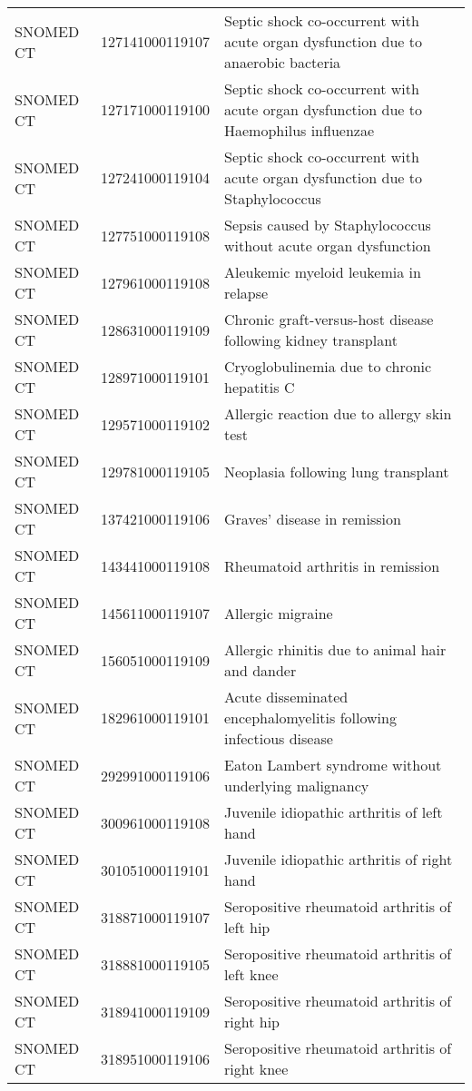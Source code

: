 \begin{longtable}{p{}p{}p{}}
  SNOMED CT & 127141000119107 & Septic shock co-occurrent with acute organ dysfunction due to anaerobic bacteria \\ 
  SNOMED CT & 127171000119100 & Septic shock co-occurrent with acute organ dysfunction due to Haemophilus influenzae \\ 
  SNOMED CT & 127241000119104 & Septic shock co-occurrent with acute organ dysfunction due to Staphylococcus \\ 
  SNOMED CT & 127751000119108 & Sepsis caused by Staphylococcus without acute organ dysfunction \\ 
  SNOMED CT & 127961000119108 & Aleukemic myeloid leukemia in relapse \\ 
  SNOMED CT & 128631000119109 & Chronic graft-versus-host disease following kidney transplant \\ 
  SNOMED CT & 128971000119101 & Cryoglobulinemia due to chronic hepatitis C \\ 
  SNOMED CT & 129571000119102 & Allergic reaction due to allergy skin test \\ 
  SNOMED CT & 129781000119105 & Neoplasia following lung transplant \\ 
  SNOMED CT & 137421000119106 & Graves' disease in remission \\ 
  SNOMED CT & 143441000119108 & Rheumatoid arthritis in remission \\ 
  SNOMED CT & 145611000119107 & Allergic migraine \\ 
  SNOMED CT & 156051000119109 & Allergic rhinitis due to animal hair and dander \\ 
  SNOMED CT & 182961000119101 & Acute disseminated encephalomyelitis following infectious disease \\ 
  SNOMED CT & 292991000119106 & Eaton Lambert syndrome without underlying malignancy \\ 
  SNOMED CT & 300961000119108 & Juvenile idiopathic arthritis of left hand \\ 
  SNOMED CT & 301051000119101 & Juvenile idiopathic arthritis of right hand \\ 
  SNOMED CT & 318871000119107 & Seropositive rheumatoid arthritis of left hip \\ 
  SNOMED CT & 318881000119105 & Seropositive rheumatoid arthritis of left knee \\ 
  SNOMED CT & 318941000119109 & Seropositive rheumatoid arthritis of right hip \\ 
  SNOMED CT & 318951000119106 & Seropositive rheumatoid arthritis of right knee \\ 

\end{longtable}
